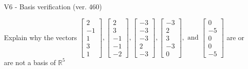 \begin{exercise}
  \begin{exerciseTitle}V6 - Basis verification (ver. 460)\end{exerciseTitle}
  \begin{exerciseStatement}
    Explain why the vectors \(\left[\begin{array}{r}
2 \\
-1 \\
1 \\
3 \\
1
\end{array}\right] , \left[\begin{array}{r}
2 \\
3 \\
-1 \\
-1 \\
-2
\end{array}\right] , \left[\begin{array}{r}
-3 \\
-3 \\
-3 \\
2 \\
-3
\end{array}\right] , \left[\begin{array}{r}
-3 \\
2 \\
3 \\
-3 \\
0
\end{array}\right] , \text{ and } \left[\begin{array}{r}
0 \\
-5 \\
0 \\
0 \\
-5
\end{array}\right]\) are or are not a basis of \(\mathbb{R}^5\)	



\end{exerciseStatement}
\end{exercise}
